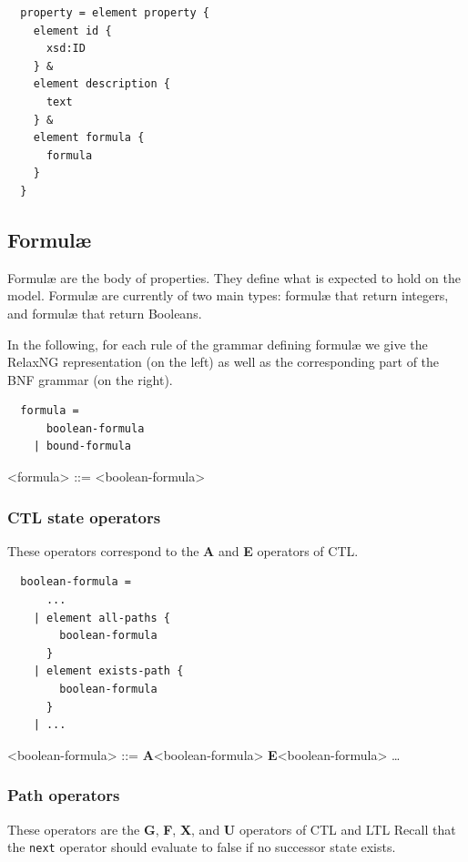 \documentclass[10pt,english,a4paper]{article}
\newcommand\ctla             {\textbf{A}\xspace}
\newcommand\ctle             {\textbf{E}\xspace}
\newcommand\ltlf             {\textbf{F}\xspace}
\newcommand\ltlg             {\textbf{G}\xspace}
\newcommand\ltlx             {\textbf{X}\xspace}
\newcommand\ltlu             {\textbf{U}\xspace}
\newcommand\mysubsection[1]{\color{sectioncolor}\subsection{#1}\color{defaultcolor}}
\begin{document}
\begin{lstlisting}
  property = element property {
    element id {
      xsd:ID
    } &
    element description {
      text
    } &
    element formula {
      formula
    }
  }
\end{lstlisting}


\mysubsection{Formul{\ae}}
Formul{\ae} are the body of properties.
They define what is expected to hold on the model.
Formul\ae{} are currently of two main types: formul{\ae} that return integers, and formul{\ae}
that return Booleans.

In the following, for each rule of the grammar defining formulæ we give the
RelaxNG representation (on the left) as well as the corresponding part of
the BNF grammar (on the right).

\begin{multicols}{2}
\begin{lstlisting}
  formula =
      boolean-formula
    | bound-formula
\end{lstlisting}
\columnbreak
\begin{grammar}
<formula> ::= <boolean-formula>
\end{grammar}
\end{multicols}

\subsubsection{CTL state operators}

These operators correspond to the \ctla and \ctle operators of CTL.

\begin{multicols}{2}
\begin{lstlisting}
  boolean-formula =
      ...
    | element all-paths {
        boolean-formula
      }
    | element exists-path {
        boolean-formula
      }
    | ...
\end{lstlisting}
\columnbreak
\begin{grammar}
<boolean-formula> ::= \ctla <boolean-formula>
\alt \ctle <boolean-formula>
\alt \ldots
\end{grammar}
\end{multicols}

\subsubsection{Path operators}

These operators are the
\ltlg,
\ltlf,
\ltlx, and
\ltlu
operators of CTL and LTL
Recall that the \lstinline!next! operator should evaluate to false if no
successor state exists.
\end{document}
